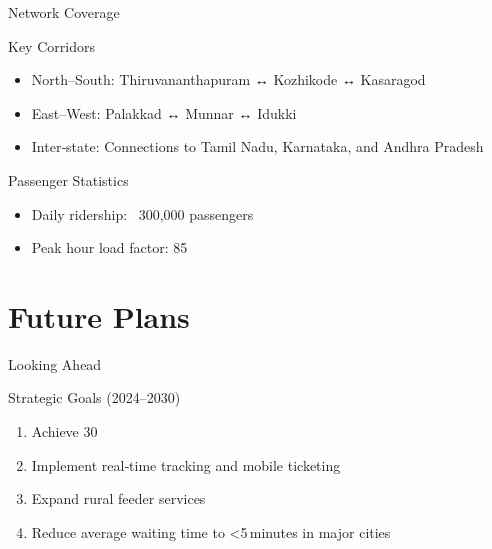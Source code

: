 \documentclass[aspectratio=169,11pt]{beamer}
\begin{document}
\begin{frame}{Network Coverage}

  \begin{block}{Key Corridors}

    \begin{itemize}

      \item North–South: Thiruvananthapuram ↔ Kozhikode ↔ Kasaragod

      \item East–West: Palakkad ↔ Munnar ↔ Idukki

      \item Inter‑state: Connections to Tamil Nadu, Karnataka, and Andhra Pradesh

    \end{itemize}

  \end{block}

  \begin{exampleblock}{Passenger Statistics}

    \begin{itemize}

      \item Daily ridership: ~300,000 passengers

      \item Peak hour load factor: 85 %

    \end{itemize}

  \end{exampleblock}

\end{frame}




\section{Future Plans}

\begin{frame}{Looking Ahead}

  \begin{block}{Strategic Goals (2024–2030)}

    \begin{enumerate}

      \item Achieve 30 %

      \item Implement real‑time tracking and mobile ticketing

      \item Expand rural feeder services

      \item Reduce average waiting time to <5 minutes in major cities

    \end{enumerate}

  \end{block}

\end{frame}
\end{document}
